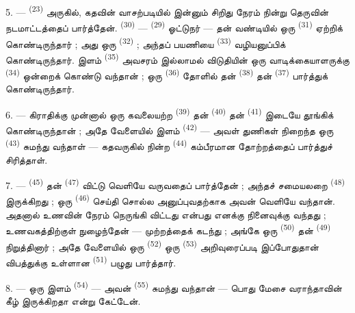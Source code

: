 5. ---  \textsuperscript{(23)} அருகில், கதவின்
வாசற்படியில் இன்னும் சிறிது நேரம் நின்று தெருவின் நடமாட்டத்தைப்
பார்த்தேன்.  \textsuperscript{(30)} — 
\textsuperscript{(29)} ஓட்டுநர் — தன் வண்டியில் ஒரு 
\textsuperscript{(31)} ஏற்றிக் கொண்டிருந்தார் ; அது ஒரு
 \textsuperscript{(32)} ; அந்தப் பயணியை
 \textsuperscript{(33)} வழியனுப்பிக்
கொண்டிருந்தார். இளம்  \textsuperscript{(35)}
அவசரம் இல்லாமல் விடுதியின் ஒரு வாடிக்கையாளருக்கு 
\textsuperscript{(34)} ஒன்றைக் கொண்டு வந்தான் ; ஒரு  \textsuperscript{(36)} தோளில் தன் 
\textsuperscript{(38)} தன் 
\textsuperscript{(37)} பார்த்துக் கொண்டிருந்தார்.

\VUsaut{4.0mm}
\VUsaut{3.0mm}

6. --- கிராதிக்கு முன்னால் ஒரு கவலையற்ற 
\textsuperscript{(39)} தன்  \textsuperscript{(40)}
தன்  \textsuperscript{(41)} இடையே
தூங்கிக் கொண்டிருந்தான் ; அதே வேளையில் இளம்  \textsuperscript{(42)} — அவள் துணிகள் நிறைந்த ஒரு
 \textsuperscript{(43)} சுமந்து வந்தாள் —
கதவருகில் நின்ற  \textsuperscript{(44)}
கம்பீரமான தோற்றத்தைப் பார்த்துச் சிரித்தாள்.

7. ---  \textsuperscript{(45)} தன் 
\textsuperscript{(47)} விட்டு வெளியே வருவதைப் பார்த்தேன் ; அந்தச்
சமையலறை  \textsuperscript{(48)} இருக்கிறது ;
ஒரு  \textsuperscript{(46)} செய்தி சொல்ல
அனுப்புவதற்காக அவன் வெளியே வந்தான். அதனால் உணவின் நேரம் நெருங்கி
விட்டது என்பது எனக்கு நினைவுக்கு வந்தது ; உணவகத்திற்குள் நுழைந்தேன் —
முற்றத்தைக் கடந்து ; அங்கே ஒரு 
\textsuperscript{(50)} தன்  \textsuperscript{(49)}
நிறுத்தினார் ; அதே வேளையில் ஒரு 
\textsuperscript{(52)} ஒரு 
\textsuperscript{(53)} அறிவுரைப்படி இப்போதுதான் விபத்துக்கு உள்ளான
 \textsuperscript{(51)} பழுது
பார்த்தார்.

8. --- ஒரு இளம்  \textsuperscript{(54)} —
அவன்  \textsuperscript{(55)} சுமந்து வந்தான் —
பொது மேசை
வராந்தாவின் கீழ் இருக்கிறதா என்று கேட்டேன்.

